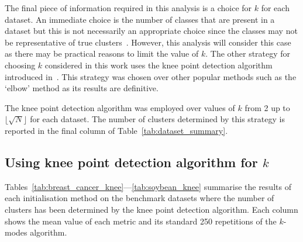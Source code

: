 \documentclass[smallextended]{svjour3}
\begin{document}
The final piece of information required in this analysis is a choice for \(k\)
for each dataset. An immediate choice is the number of classes that are present
in a dataset but this is not necessarily an appropriate choice since the classes
may not be representative of true clusters~\cite{Memoli2011}. However, this
analysis will consider this case as there may be practical reasons to limit the
value of \(k\). The other strategy for choosing \(k\) considered in this work
uses the knee point detection algorithm introduced in~\cite{Satopaa2011}. This
strategy was chosen over other popular methods such as the `elbow' method as its
results are definitive.

The knee point detection algorithm was employed over values of \(k\) from 2 up
to \(\lfloor\sqrt N\rfloor\) for each dataset. The number of clusters determined
by this strategy is reported in the final column of
Table~\ref{tab:dataset_summary}.


\subsection{Using knee point detection algorithm for \(k\)}\label{subsec:knee}

Tables~\ref{tab:breast_cancer_knee}---\ref{tab:soybean_knee}
summarise the results of each initialisation method on the benchmark datasets
where the number of clusters has been determined by the knee point detection
algorithm. Each column shows the mean value of each metric and its standard
250
repetitions of the \(k\)-modes algorithm.
\end{document}
